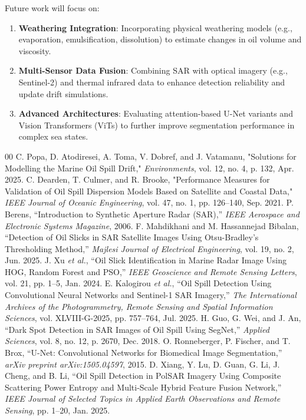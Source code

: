 \documentclass[conference]{IEEEtran}
\begin{document}
Future work will focus on:
\begin{enumerate}
\item \textbf{Weathering Integration}: Incorporating physical weathering models (e.g., evaporation, emulsification, dissolution) to estimate changes in oil volume and viscosity.
\item \textbf{Multi-Sensor Data Fusion}: Combining SAR with optical imagery (e.g., Sentinel-2) and thermal infrared data to enhance detection reliability and update drift simulations.
\item \textbf{Advanced Architectures}: Evaluating attention-based U-Net variants and Vision Transformers (ViTs) to further improve segmentation performance in complex sea states.
\end{enumerate}

\begin{thebibliography}{00}
 C. Popa, D. Atodiresei, A. Toma, V. Dobref, and J. Vatamanu, "Solutions for Modelling the Marine Oil Spill Drift," \emph{Environments}, vol. 12, no. 4, p. 132, Apr. 2025.
 C. Dearden, T. Culmer, and R. Brooke, "Performance Measures for Validation of Oil Spill Dispersion Models Based on Satellite and Coastal Data," \emph{IEEE Journal of Oceanic Engineering}, vol. 47, no. 1, pp. 126–140, Sep. 2021.
 P. Berens, ``Introduction to Synthetic Aperture Radar (SAR),'' \emph{IEEE Aerospace and Electronic Systems Magazine}, 2006.
 F. Mahdikhani and M. Hassannejad Bibalan, ``Detection of Oil Slicks in SAR Satellite Images Using Otsu-Bradley’s Thresholding Method,'' \emph{Majlesi Journal of Electrical Engineering}, vol. 19, no. 2, Jun. 2025.
 J. Xu \emph{et al.}, ``Oil Slick Identification in Marine Radar Image Using HOG, Random Forest and PSO,'' \emph{IEEE Geoscience and Remote Sensing Letters}, vol. 21, pp. 1–5, Jan. 2024.
 E. Kalogirou \emph{et al.}, ``Oil Spill Detection Using Convolutional Neural Networks and Sentinel-1 SAR Imagery,'' \emph{The International Archives of the Photogrammetry, Remote Sensing and Spatial Information Sciences}, vol. XLVIII-G-2025, pp. 757–764, Jul. 2025.
 H. Guo, G. Wei, and J. An, ``Dark Spot Detection in SAR Images of Oil Spill Using SegNet,'' \emph{Applied Sciences}, vol. 8, no. 12, p. 2670, Dec. 2018.
 O. Ronneberger, P. Fischer, and T. Brox, ``U-Net: Convolutional Networks for Biomedical Image Segmentation,'' \emph{arXiv preprint arXiv:1505.04597}, 2015.
 D. Xiang, Y. Lu, D. Guan, G. Li, J. Cheng, and B. Li, ``Oil Spill Detection in PolSAR Imagery Using Composite Scattering Power Entropy and Multi-Scale Hybrid Feature Fusion Network,'' \emph{IEEE Journal of Selected Topics in Applied Earth Observations and Remote Sensing}, pp. 1–20, Jan. 2025.

\end{thebibliography}
\end{document}
